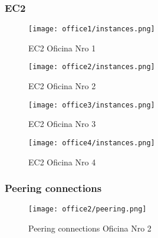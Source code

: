 \subsubsection{EC2}
\begin{figure}[H]
    \centering
    \texttt{[image: office1/instances.png]}
    \caption{EC2 Oficina Nro 1}
\end{figure}
\begin{figure}[H]
    \centering
    \texttt{[image: office2/instances.png]}
    \caption{EC2 Oficina Nro 2}
\end{figure}
\begin{figure}[H]
    \centering
    \texttt{[image: office3/instances.png]}
    \caption{EC2 Oficina Nro 3}
\end{figure}
\begin{figure}[H]
    \centering
    \texttt{[image: office4/instances.png]}
    \caption{EC2 Oficina Nro 4}
\end{figure}

\subsubsection{Peering connections}
\begin{figure}[H]
    \centering
    \texttt{[image: office2/peering.png]}
    \caption{Peering connections Oficina Nro 2}
\end{figure}